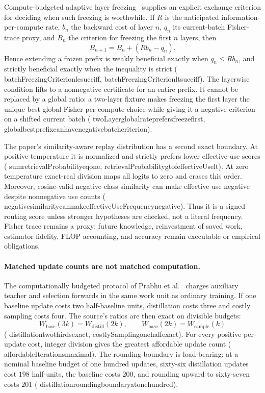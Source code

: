 \documentclass[11pt]{article}
\newcommand{\leanname}[1]{{\scriptsize\ttfamily
  \def\_{\textunderscore\allowbreak}#1}}
\begin{document}
Compute-budgeted adaptive layer freezing~\cite{seo2025budgeted} supplies an
explicit exchange criterion for deciding when such freezing is worthwhile.
If $R$ is the anticipated information-per-compute rate, $b_n$ the backward
cost of layer $n$, $q_n$ its current-batch Fisher-trace proxy, and $B_n$ the
criterion for freezing the first $n$ layers, then
\[
  B_{n+1}=B_n+(R b_n-q_n).
\]
Hence extending a frozen prefix is weakly beneficial exactly when
$q_n\le Rb_n$, and strictly beneficial exactly when the inequality is strict
(\leanname{batchFreezingCriterion\_le\_succ\_iff},
\leanname{batchFreezingCriterion\_lt\_succ\_iff}).  The layerwise condition
lifts to a nonnegative certificate for an entire prefix.  It cannot be
replaced by a global ratio: a two-layer fixture makes freezing the first layer
the unique best global Fisher-per-compute choice while giving it a negative
criterion on a shifted current batch
(\leanname{twoLayer\_global\_rate\_prefers\_freeze\_first},
\leanname{global\_best\_prefix\_can\_have\_negative\_batch\_criterion}).

The paper's similarity-aware replay distribution has a second exact boundary.
At positive temperature it is normalized and strictly prefers lower
effective-use scores
(\leanname{sum\_retrievalProbability\_eq\_one},
\leanname{retrievalProbability\_gt\_of\_effectiveUse\_lt}).  At zero
temperature exact-real division maps all logits to zero and erases this order.
Moreover, cosine-valid negative class similarity can make effective use
negative despite nonnegative use counts
(\leanname{negative\_similarity\_can\_make\_effectiveUseFrequency\_negative}).
Thus it is a signed routing score unless stronger hypotheses are checked, not
a literal frequency.  Fisher trace remains a proxy: future knowledge,
reinvestment of saved work, estimator fidelity, FLOP accounting, and accuracy
remain executable or empirical obligations.

\paragraph{Matched update counts are not matched computation.}
The computationally budgeted protocol of Prabhu et
al.~\cite{prabhu2023budgetcl} charges auxiliary teacher and selection
forwards in the same work unit as ordinary training.  If one baseline update
costs two half-baseline units, distillation costs three and costly sampling
costs four.  The source's ratios are then exact on divisible budgets:
\[
  W_{\mathrm{base}}(3k)=W_{\mathrm{distill}}(2k),
  \qquad
  W_{\mathrm{base}}(2k)=W_{\mathrm{sample}}(k)
\]
(\leanname{distillation\_two\_thirds\_exact},
\leanname{costlySampling\_one\_half\_exact}).
For every positive per-update cost, integer division gives the greatest
affordable update count
(\leanname{affordableIterations\_maximal}). The rounding boundary is
load-bearing: at a nominal baseline budget of one hundred updates,
sixty-six distillation updates cost $198$ half-units, the baseline costs
$200$, and rounding upward to sixty-seven costs $201$
(\leanname{distillation\_rounding\_boundary\_at\_one\_hundred}).
\end{document}
